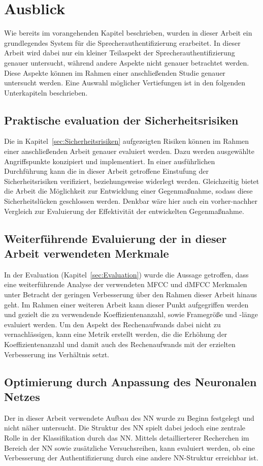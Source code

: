 \section{Ausblick}
Wie bereits im vorangehenden Kapitel beschrieben, wurden in dieser Arbeit ein grundlegendes System für die Sprecherauthentifizierung erarbeitet.
In dieser Arbeit wird dabei nur ein kleiner Teilaspekt der Sprecherauthentifizierung genauer untersucht, während andere Aspekte nicht genauer betrachtet werden.
Diese Aspekte können im Rahmen einer anschließenden Studie genauer untersucht werden.
Eine Auswahl möglicher Vertiefungen ist in den folgenden Unterkapiteln beschrieben.

\subsection{Praktische evaluation der Sicherheitsrisiken}
Die in Kapitel~\ref{sec:Sicherheitsrisiken} aufgezeigten Risiken können im Rahmen einer anschließenden Arbeit genauer evaluiert werden.
Dazu werden ausgewählte Angriffspunkte konzipiert und implementiert.
In einer ausführlichen Durchführung kann die in dieser Arbeit getroffene Einstufung der Sicherheitsrisiken verifiziert, beziehungsweise widerlegt werden.
Gleichzeitig bietet die Arbeit die Möglichkeit zur Entwicklung einer Gegenmaßnahme, sodass diese Sicherheitslücken geschlossen werden.
Denkbar wäre hier auch ein vorher-nachher Vergleich zur Evaluierung der Effektivität der entwickelten Gegenmaßnahme.

\subsection{Weiterführende Evaluierung der in dieser Arbeit verwendeten Merkmale}
In der Evaluation (Kapitel~\ref{sec:Evaluation}) wurde die Aussage getroffen, dass eine weiterführende Analyse der verwendeten \ac{MFCC} und \ac{dMFCC} Merkmalen unter Betracht der geringen Verbesserung über den Rahmen dieser Arbeit hinaus geht.
Im Rahmen einer weiteren Arbeit kann dieser Punkt aufgegriffen werden und gezielt die zu verwendende Koeffizientenanzahl, sowie Framegröße und -länge evaluiert werden.
Um den Aspekt des Rechenaufwands dabei nicht zu vernachlässigen, kann eine Metrik erstellt werden, die die Erhöhung der Koeffizientenanzahl und damit auch des Rechenaufwands mit der erzielten Verbesserung ins Verhältnis setzt.

\subsection{Optimierung durch Anpassung des Neuronalen Netzes}
Der in dieser Arbeit verwendete Aufbau des \ac{NN} wurde zu Beginn festgelegt und nicht näher untersucht.
Die Struktur des \ac{NN} spielt dabei jedoch eine zentrale Rolle in der Klassifikation durch das \ac{NN}.
Mittels detaillierterer Recherchen im Bereich der \ac{NN} sowie zusätzliche Versuchsreihen, kann evaluiert werden, ob eine Verbesserung der Authentifizierung durch eine andere \ac{NN}-Struktur erreichbar ist.

